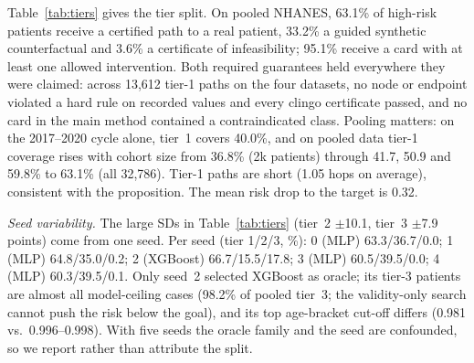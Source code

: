 \documentclass[conference]{IEEEtran}
\begin{document}
Table~\ref{tab:tiers} gives the tier split. On pooled NHANES, 63.1\% of high-risk patients receive a certified path to a real patient, 33.2\% a guided synthetic counterfactual and 3.6\% a certificate of infeasibility; 95.1\% receive a card with at least one allowed intervention. Both required guarantees held everywhere they were claimed: across 13,612 tier-1 paths on the four datasets, no node or endpoint violated a hard rule on recorded values and every clingo certificate passed, and no card in the main method contained a contraindicated class. Pooling matters: on the 2017--2020 cycle alone, tier~1 covers 40.0\%, and on pooled data tier-1 coverage rises with cohort size from 36.8\% (2k patients) through 41.7, 50.9 and 59.8\% to 63.1\% (all 32,786). Tier-1 paths are short (1.05 hops on average), consistent with the proposition. The mean risk drop to the target is 0.32. %

\emph{Seed variability.} The large SDs in Table~\ref{tab:tiers} (tier~2 $\pm$10.1, tier~3 $\pm$7.9 points) come from one seed. Per seed (tier 1/2/3, \%): 0 (MLP) 63.3/36.7/0.0; 1 (MLP) 64.8/35.0/0.2; 2 (XGBoost) 66.7/15.5/17.8; 3 (MLP) 60.5/39.5/0.0; 4 (MLP) 60.3/39.5/0.1. Only seed~2 selected XGBoost as oracle; its tier-3 patients are almost all model-ceiling cases (98.2\% of pooled tier~3; the validity-only search cannot push the risk below the goal), and its top age-bracket cut-off differs (0.981 vs.\ 0.996--0.998). With five seeds the oracle family and the seed are confounded, so we report rather than attribute the split.
\end{document}

